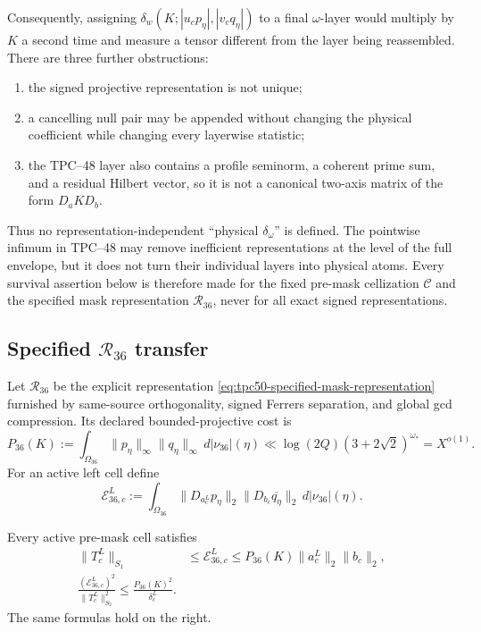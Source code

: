 Consequently, assigning
\(\delta_w(K;|u_cp_\eta|,|v_cq_\eta|)\) to a final \(\omega\)-layer
would multiply by \(K\) a second time and measure a tensor different
from the layer being reassembled.  There are three further obstructions:
\begin{enumerate}[label=\textup{(\roman*)},leftmargin=2.4em]
 \item the signed projective representation is not unique;
 \item a cancelling null pair may be appended without changing the
       physical coefficient while changing every layerwise statistic;
 \item the TPC--48 layer also contains a profile seminorm, a coherent
       prime sum, and a residual Hilbert vector, so it is not a
       canonical two-axis matrix of the form \(D_aKD_b\).
\end{enumerate}
Thus no representation-independent ``physical \(\delta_\omega\)'' is
defined.  The pointwise infimum in TPC--48 may remove inefficient
representations at the level of the full envelope, but it does not turn
their individual layers into physical atoms.  Every survival assertion
below is therefore made for the fixed pre-mask cellization
\(\mathscr C\) and the specified mask representation
\(\mathscr R_{36}\), never for all exact signed representations.

\subsection{Specified \texorpdfstring{\(\mathscr R_{36}\)}{R36} transfer}

Let \(\mathscr R_{36}\) be the explicit representation
\eqref{eq:tpc50-specified-mask-representation} furnished by
same-source orthogonality, signed Ferrers separation, and global gcd
compression.  Its declared bounded-projective cost is
\begin{equation}
 P_{36}(K)
 :=\int_{\Omega_{36}}
 \|p_\eta\|_\infty\|q_\eta\|_\infty
 \,d|\nu_{36}|(\eta)
 \ll \log(2Q)(3+2\sqrt2)^{\omega_*}
 =X^{o(1)}.
 \label{eq:tpc50-R36-cost}
\end{equation}
For an active left cell define
\begin{equation}
 \mathcal E_{36,c}^L
 :=\int_{\Omega_{36}}
 \|D_{a_c^L}p_\eta\|_2
 \|D_{b_c}\overline{q_\eta}\|_2
 \,d|\nu_{36}|(\eta).
 \label{eq:tpc50-R36-cell-envelope}
\end{equation}

\begin{theorem}
\label{thm:tpc50-canonical-cell-transfer}
Every active pre-mask cell satisfies
\begin{align}
 \|T_c^L\|_{S_1}
 &\le \mathcal E_{36,c}^L
 \le P_{36}(K)\|a_c^L\|_2\|b_c\|_2,
 \label{eq:tpc50-cell-nuclear-transfer}\\
 \boxed{
 \frac{(\mathcal E_{36,c}^L)^2}
      {\|T_c^L\|_{S_2}^2}
 \le\frac{P_{36}(K)^2}{\delta_c^L}.}
 \label{eq:tpc50-cell-energy-transfer}
\end{align}
The same formulas hold on the right.
\end{theorem}

